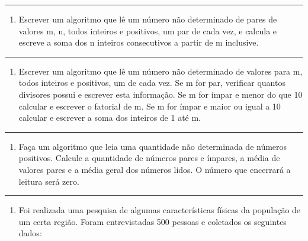 \documentclass[12pt,a4paper]{article}
\providecommand{\tightlist}{%
      \setlength{\itemsep}{0pt}\setlength{\parskip}{0pt}}
\begin{document}
    \begin{center}\rule{0.5\linewidth}{0.5pt}\end{center}

\begin{enumerate}
\def\labelenumi{\arabic{enumi}.}
\setcounter{enumi}{7}
\tightlist
\item
  Escrever um algoritmo que lê um número não determinado de pares de
  valores m, n, todos inteiros e positivos, um par de cada vez, e
  calcula e escreve a soma dos n inteiros consecutivos a partir de m
  inclusive.
\end{enumerate}

    \begin{center}\rule{0.5\linewidth}{0.5pt}\end{center}

\begin{enumerate}
\def\labelenumi{\arabic{enumi}.}
\setcounter{enumi}{8}
\tightlist
\item
  Escrever um algoritmo que lê um número não determinado de valores para
  m, todos inteiros e positivos, um de cada vez. Se m for par, verificar
  quantos divisores possui e escrever esta informação. Se m for ímpar e
  menor do que 10 calcular e escrever o fatorial de m. Se m for ímpar e
  maior ou igual a 10 calcular e escrever a soma dos inteiros de 1 até
  m.
\end{enumerate}

    \begin{center}\rule{0.5\linewidth}{0.5pt}\end{center}

\begin{enumerate}
\def\labelenumi{\arabic{enumi}.}
\setcounter{enumi}{9}
\tightlist
\item
  Faça um algoritmo que leia uma quantidade não determinada de números
  positivos. Calcule a quantidade de números pares e ímpares, a média de
  valores pares e a média geral dos números lidos. O número que
  encerrará a leitura será zero.
\end{enumerate}

    \begin{center}\rule{0.5\linewidth}{0.5pt}\end{center}

\begin{enumerate}
\def\labelenumi{\arabic{enumi}.}
\setcounter{enumi}{10}
\tightlist
\item
  Foi realizada uma pesquisa de algumas características físicas da
  população de um certa região. Foram entrevistadas 500 pessoas e
  coletados os seguintes dados:
\end{enumerate}
\end{document}

